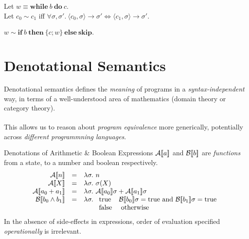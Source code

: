 \begin{frame}
    Let $w \equiv \mathbf{while}\ b\ \mathbf{do}\ c$.\\
    Let $c_0 \sim c_1$ iff $\forall \sigma, \sigma'.\ \langle c_0, \sigma
    \rangle \rightarrow \sigma' \Leftrightarrow \langle c_1, \sigma \rangle
    \rightarrow \sigma'$.
    \begin{theorem}
        $w \sim \mathbf{if}\ b\ \mathbf{then}\ \{c; w\}\ \mathbf{else}\ \mathbf{skip}$.
    \end{theorem}
\end{frame}

\section{Denotational Semantics}

\begin{frame}
    Denotational semantics defines the \emph{meaning} of programs in a
    \emph{syntax-independent} way, in terms of a well-understood area of
    mathematics (domain theory or category theory).\\~\\
    This allows us to reason about \emph{program equivalence} more generically,
    potentially across \emph{different programmning languages}.
\end{frame}

\begin{frame}{Denotations of Arithmetic \& Boolean Expressions}
    $\mathcal{A} [\![ a ]\!]$ and $\mathcal{B} [\![ b ]\!]$ are \emph{functions} from a state, to a number and
    boolean respectively.
    \pause
    \[\begin{array}{rcl}
        \denA{n} & = & \lambda \sigma.\ n \\
        \denA{X} & = & \lambda \sigma.\ \sigma(X) \\
        \denA{a_0 + a_1} & = & \lambda \sigma.\ \denA{a_0}\sigma + \denA{a_1}\sigma \\
        \denB{b_0 \wedge b_1} & = &
            \lambda \sigma.\ \begin{array}[t]{ll}
                \mathrm{true} & \denB{b_0}\sigma = \mathrm{true} \text{ and } \denB{b_1}\sigma = \mathrm{true} \\
                \mathrm{false} & \text{ otherwise}
            \end{array}
    \end{array}\]
    \pause
    \alert{In the absence of side-effects in expressions, order of evaluation specified \emph{operationally} is irrelevant.}
\end{frame}

